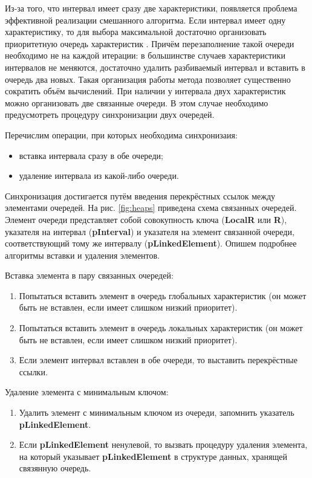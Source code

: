 \par
Из-за того, что интервал имеет сразу две характеристики, появляется проблема эффективной реализации смешанного алгоритма. Если интервал имеет одну характеристику, то для выбора максимальной
достаточно организовать приоритетную очередь характеристик \cite{minmaxheap}.
Причём перезаполнение такой очереди необходимо не на каждой итерации: в большинстве случаев характеристики интервалов не меняются, достаточно удалить разбиваемый интервал и вставить в очередь два новых.
Такая организация работы метода позволяет существенно сократить объём вычислений. При наличии у интервала двух характеристик можно организовать две связанные очереди. В этом случае необходимо предусмотреть
процедуру синхронизации двух очередей.
\par
Перечислим операции, при которых необходима синхронизаия:
\begin{itemize}
  \item вставка интервала сразу в обе очереди;
  \item удаление интервала из какой-либо очереди.
\end{itemize}
\par
Синхронизация достигается путём введения перекрёстных ссылок между элементами очередей. На рис. \ref{fig:heaps} приведена схема связанных очередей. Элемент очереди представляет собой
совокупность ключа (\textbf{LocalR} или \textbf{R}), указателя на интервал (\textbf{pInterval}) и указателя на элемент связанной очереди, соответствующий тому же интервалу (\textbf{pLinkedElement}).
Опишем подробнее алгоритмы вставки и удаления элементов.
\par
Вставка элемента в пару связанных очередей:
\begin{enumerate}
  \item Попытаться вставить элемент в очередь глобальных характеристик (он может быть не вставлен, если имеет слишком низкий приоритет).
  \item Попытаться вставить элемент в очередь локальных характеристик (он может быть не вставлен, если имеет слишком низкий приоритет).
  \item Если элемент интервал вставлен в обе очереди, то выставить перекрёстные ссылки.
\end{enumerate}
\par
Удаление элемента с минимальным ключом:
\begin{enumerate}
  \item Удалить элемент с минимальным ключом из очереди, запомнить указатель \textbf{pLinkedElement}.
  \item Если \textbf{pLinkedElement} ненулевой, то вызвать процедуру удаления элемента, на который указывает \textbf{pLinkedElement} в структуре данных, хранящей связянную очередь.
\end{enumerate}
